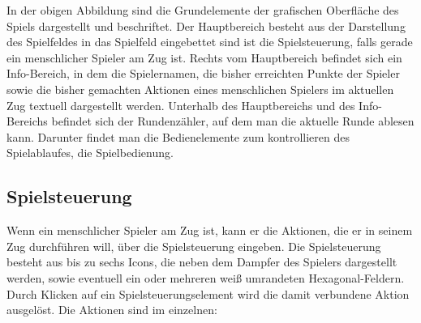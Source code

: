 \documentclass[12pt,a4paper, ngerman, oneside]{scrartcl}
\begin{document}
In der obigen Abbildung sind die Grundelemente der grafischen Oberfläche des
Spiels dargestellt und beschriftet. Der Hauptbereich besteht aus der Darstellung
des Spielfeldes in das Spielfeld eingebettet sind ist die Spielsteuerung, falls
gerade ein menschlicher Spieler am Zug ist. Rechts vom Hauptbereich befindet
sich ein Info-Bereich, in dem die Spielernamen, die bisher erreichten Punkte der
Spieler sowie die bisher gemachten Aktionen eines menschlichen Spielers im
aktuellen Zug textuell dargestellt werden. Unterhalb des Hauptbereichs und des
Info-Bereichs befindet sich der Rundenzähler, auf dem man die aktuelle Runde
ablesen kann. Darunter findet man die Bedienelemente zum kontrollieren des
Spielablaufes, die Spielbedienung.

\subsection{Spielsteuerung}

Wenn ein menschlicher Spieler am Zug ist, kann er die Aktionen, die er in seinem
Zug durchführen will, über die Spielsteuerung eingeben. Die Spielsteuerung
besteht aus bis zu sechs Icons, die neben dem Dampfer des Spielers dargestellt
werden, sowie eventuell ein oder mehreren weiß umrandeten Hexagonal-Feldern.
Durch Klicken auf ein Spielsteuerungselement wird die damit verbundene Aktion
ausgelöst. Die Aktionen sind im einzelnen:
\end{document}
